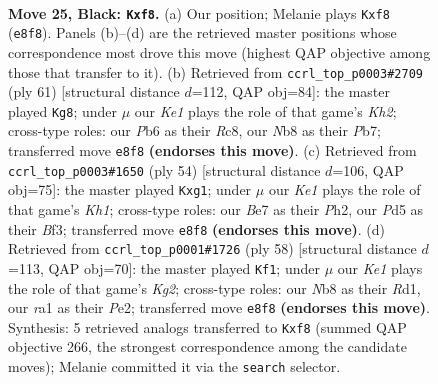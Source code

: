 \documentclass[11pt]{article}
\begin{document}
\clearpage

\begin{figure}[p]\centering
\begin{subfigure}{0.46\textwidth}\centering
\resizebox{\linewidth}{!}{%
\newchessgame
\chessboard[
  setfen={rn2kR2/p3b3/1p1qQ3/3pN1P1/P7/2NB4/1P3P2/R1B1K3 b Q - 0 25},
  showmover=false,
  pgfstyle=straightmove, color=movearrow, markmove={e8-f8}
]}
\caption{}
\end{subfigure}\hfill
\begin{subfigure}{0.46\textwidth}\centering
\resizebox{\linewidth}{!}{%
\newchessgame
\chessboard[
  setfen={2rr4/1p1q2bk/p2p2Qp/5P2/1Pn5/5R2/P2B3P/1NR4K b - - 0 31},
  showmover=false,
  pgfstyle=straightmove, color=movearrow, markmove={h7-g8}
]}
\caption{}
\end{subfigure}
\\[4pt]
\begin{subfigure}{0.46\textwidth}\centering
\resizebox{\linewidth}{!}{%
\newchessgame
\chessboard[
  setfen={5rk1/1p3pp1/p1n1b3/P2N4/3PPQ1q/5B2/1P5P/3R2rK w - - 0 28},
  showmover=false,
  pgfstyle=straightmove, color=movearrow, markmove={h1-g1}
]}
\caption{}
\end{subfigure}\hfill
\begin{subfigure}{0.46\textwidth}\centering
\resizebox{\linewidth}{!}{%
\newchessgame
\chessboard[
  setfen={2r3k1/p2p1pp1/4p3/5n1p/1P5P/PN1QBPq1/4P1K1/3R4 w - - 0 30},
  showmover=false,
  pgfstyle=straightmove, color=movearrow, markmove={g2-f1}
]}
\caption{}
\end{subfigure}
\caption{\textbf{Move 25, Black: \texttt{Kxf8}.} (a) Our position; Melanie plays \texttt{Kxf8} (\texttt{e8f8}). Panels (b)--(d) are the retrieved master positions whose correspondence most drove this move (highest QAP objective among those that transfer to it). (b) Retrieved from \texttt{ccrl\_top\_p0003\#2709} (ply 61) [structural distance $d$=112, QAP obj=84]: the master played \texttt{Kg8}; under $\mu$ our \emph{Ke1} plays the role of that game's \emph{Kh2}; cross-type roles: our \emph{P}b6 as their \emph{R}c8, our \emph{N}b8 as their \emph{P}b7; transferred move \texttt{e8f8} \textbf{(endorses this move)}. (c) Retrieved from \texttt{ccrl\_top\_p0003\#1650} (ply 54) [structural distance $d$=106, QAP obj=75]: the master played \texttt{Kxg1}; under $\mu$ our \emph{Ke1} plays the role of that game's \emph{Kh1}; cross-type roles: our \emph{B}e7 as their \emph{P}h2, our \emph{P}d5 as their \emph{B}f3; transferred move \texttt{e8f8} \textbf{(endorses this move)}. (d) Retrieved from \texttt{ccrl\_top\_p0001\#1726} (ply 58) [structural distance $d$=113, QAP obj=70]: the master played \texttt{Kf1}; under $\mu$ our \emph{Ke1} plays the role of that game's \emph{Kg2}; cross-type roles: our \emph{N}b8 as their \emph{R}d1, our \emph{r}a1 as their \emph{P}e2; transferred move \texttt{e8f8} \textbf{(endorses this move)}. Synthesis: 5 retrieved analogs transferred to \texttt{Kxf8} (summed QAP objective 266, the strongest correspondence among the candidate moves); Melanie committed it via the \texttt{search} selector.}
\label{fig:thought-m49}
\end{figure}
\end{document}
